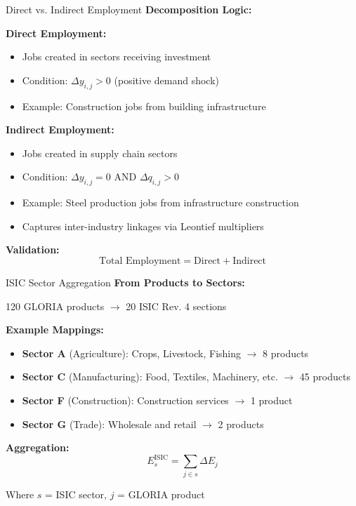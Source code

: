 \documentclass[10pt]{beamer}
\begin{document}
\begin{frame}{Direct vs. Indirect Employment}
\textbf{Decomposition Logic:}

\vspace{0.3cm}

\textbf{Direct Employment:}
\begin{itemize}
    \item Jobs created in sectors receiving investment
    \item Condition: $\Delta y_{i,j} > 0$ (positive demand shock)
    \item Example: Construction jobs from building infrastructure
\end{itemize}

\vspace{0.5cm}

\textbf{Indirect Employment:}
\begin{itemize}
    \item Jobs created in supply chain sectors
    \item Condition: $\Delta y_{i,j} = 0$ AND $\Delta q_{i,j} > 0$
    \item Example: Steel production jobs from infrastructure construction
    \item Captures inter-industry linkages via Leontief multipliers
\end{itemize}

\vspace{0.5cm}

\textbf{Validation:}
\[
\text{Total Employment} = \text{Direct} + \text{Indirect}
\]
\end{frame}

\begin{frame}{ISIC Sector Aggregation}
\textbf{From Products to Sectors:}

\vspace{0.3cm}

120 GLORIA products $\rightarrow$ 20 ISIC Rev. 4 sections

\vspace{0.5cm}

\textbf{Example Mappings:}
\begin{itemize}
    \item \textbf{Sector A} (Agriculture): Crops, Livestock, Fishing $\rightarrow$ 8 products
    \item \textbf{Sector C} (Manufacturing): Food, Textiles, Machinery, etc. $\rightarrow$ 45 products
    \item \textbf{Sector F} (Construction): Construction services $\rightarrow$ 1 product
    \item \textbf{Sector G} (Trade): Wholesale and retail $\rightarrow$ 2 products
\end{itemize}

\vspace{0.5cm}

\textbf{Aggregation:}
\[
E^{\text{ISIC}}_s = \sum_{j \in s} \Delta E_j
\]

Where $s$ = ISIC sector, $j$ = GLORIA product
\end{frame}
\end{document}
